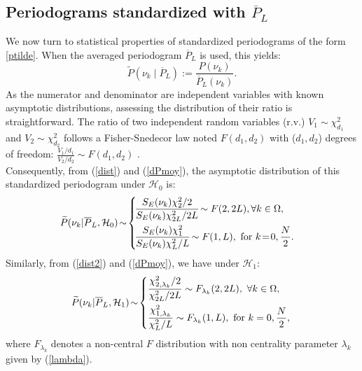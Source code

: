 \documentclass[journal]{IEEEtran}
\begin{document}
\subsection{Periodograms standardized with $\overline{P}_L$}
\label{standard}
We now turn to  statistical properties of standardized periodograms of the form \eqref{ptilde}.
When the averaged periodogram $\overline{P}_L$ is used, this yields:
\begin{equation} 
\label{eq_pr}
	 \widetilde{P}(\nu_k \;|\; \overline{P}_L) := \frac{P(\nu_k)}{\overline{P}_L(\nu_k)}.
\end{equation}
\indent As the numerator and denominator are independent variables with known asymptotic distributions, assessing the distribution of their ratio is straightforward. 
The ratio of two  independent random variables (r.v.)  $V_1\!\sim\! \chi_{d_1}^2$ and $V_2\!\sim\! \chi_{d_2}^2$ follows a Fisher-Snedecor law  noted $F(d_1,d_2)$ with ($d_1,d_2$) degrees of freedom: $\frac{V_1/d_1}{V_2/d_2} \sim F(d_1,d_2)$ \cite{Abramowitz_1972}. \\
Consequently, from (\ref{dist}) and (\ref{dPmoy}), the asymptotic distribution of this standardized periodogram under $\mathcal{H}_0$ is:
\begin{equation} \hspace{-3mm}
\widetilde{P}(\nu_k   |  \overline{P}_L, {\cal{H}}_0)  \! \sim \!
  \left\{         
      \begin{aligned}
	   &  \! \frac{S_E(\nu_k)\chi_2^2/2}{S_E(\nu_k)\chi_{2L}^2/2L}  \!  \sim F(2,2L),  \forall k  \in  \Omega ,\\
	    & \!  \frac{S_E(\nu_k)\chi_1^2}{S_E(\nu_k)\chi_{L}^2/L}  \! \sim F(1,L),   \text{ for }  k  \!= \! 0, \frac{N}{2}.
      \end{aligned}
    \right.
    \label{dist3}
\end{equation}
Similarly, from (\ref{dist2}) and  (\ref{dPmoy}), { we have  under $\mathcal{H}_1$}:
\begin{equation}
 \! \widetilde{P}(\nu_k |  \overline{P}_L, {\cal{H}}_1) \! \sim \!
  \left\{         
      \begin{aligned}
	   &\frac{\chi_{2, \lambda_k}^2/2}{\chi_{2L}^2/2L} \sim F_{\lambda_k}(2,2L),   ~ \forall k  \in  \Omega, \\
	    &\frac{\chi_{1, \lambda_k}^2}{\chi_{L}^2/L} \sim F_{\lambda_k}(1,L),  \text{ for }  k = 0, \frac{N}{2},
      \end{aligned}
    \right.
	\label{dist_H1}
\end{equation}
where $F_{\lambda_k}$ denotes a non-central $F$ distribution with non centrality parameter  $\lambda_k$ given by (\ref{lambda}).
\end{document}
